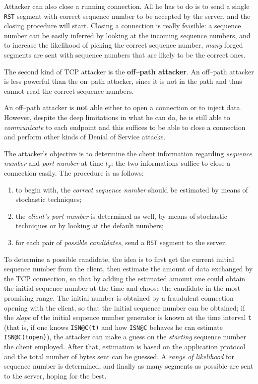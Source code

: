 \documentclass[10pt]{extreport}
\begin{document}
Attacker can also close a running connection. All he has to do is to send a
single \texttt{RST} segment with correct sequence number to be accepted by the
server, and the closing procedure will start. Closing a connection is really
feasible: a sequence number can be easily inferred by looking at the incoming
sequence numbers, and to increase the likelihood of picking the correct
sequence number, \emph{many} forged segments are sent with sequence numbers
that are likely to be the correct ones.

The second kind of TCP attacker is the \textbf{off--path attacker}. An
off--path attacker is less powerful than the on--path attacker, since it is not
in the path and thus cannot read the correct sequence numbers.

An off--path attacker is \textbf{not} able either to open a connection or to
inject data. However, despite the deep limitations in what he can do, he is
still able to \emph{communicate} to each endpoint and this suffices to be able
to close a connection and perform other kinds of Denial of Service attacks.

The attacker's objective is to determine the client information regarding \emph{sequence number} and \emph{port number} at time $t_x$: the two informations suffice to close a connection easily. The procedure is as follows:
\begin{enumerate}
    \item to begin with, the \emph{correct sequence number} should be estimated by
        means of stochastic techniques;
    \item the \emph{client's port number} is determined as well, by means of
        stochastic techniques or by looking at the default numbers;
    \item for each pair of \emph{possible candidates}, send a \texttt{RST} segment to
        the server.
\end{enumerate}

To determine a possible candidate, the idea is to first get the current initial
sequence number from the client, then estimate the amount of data exchanged by
the TCP connection, so that by adding the estimated amount one could obtain the
initial sequence number at the time and choose the candidate in the most promising range.
The initial number is obtained by a fraudulent connection opening with the
client, so that the initial sequence number can be obtained; if the
\emph{slope} of the initial sequence number generator is known at the time
interval \texttt{t} (that is, if one knows \texttt{ISN@C(t)} and how \texttt{ISN@C}
behaves he can estimate \texttt{ISN@C(topen)}), the attacker can make a guess
on the \emph{starting} sequence number the client employed. After that,
estimation is based on the application protocol and the total number of bytes
sent can be guessed. A \emph{range of likelihood} for sequence number is
determined, and finally as many segments as possible are sent to the server,
hoping for the best.
\end{document}
